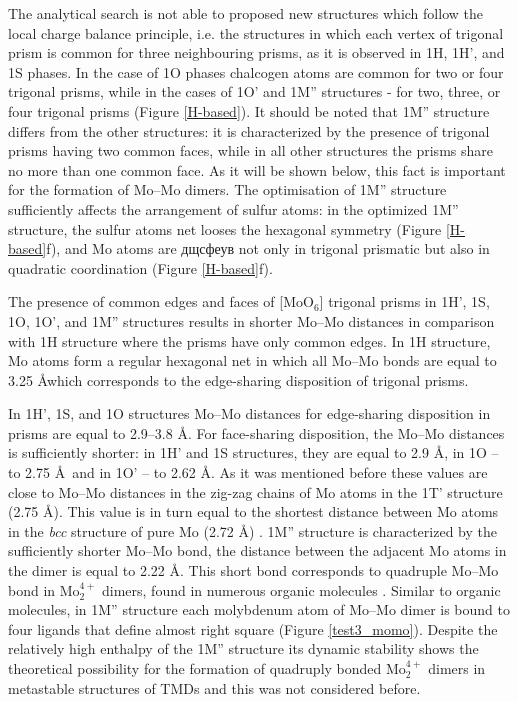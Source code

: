 \documentclass[a4paperm]{article}
\begin{document}
The analytical search is not able to proposed new structures which follow the local charge balance principle, i.e. the structures in which each vertex of trigonal prism is common for three neighbouring prisms, as it is observed in 1H, 1H', and 1S phases. In the case of 1O phases chalcogen atoms are common for two or four trigonal prisms, while in the cases of 1O' and 1M'' structures - for two, three, or four trigonal prisms (Figure \ref{H-based}). It should be noted that 1M'' structure differs from the other structures: it is characterized by the presence of trigonal prisms having two common faces, while in all other structures the prisms share no more than one common face.
As it will be shown below, this fact is important for the formation of Mo--Mo dimers.
The optimisation of 1M'' structure sufficiently affects the arrangement of sulfur atoms: in the optimized 1M'' structure, the sulfur atoms net looses the hexagonal symmetry (Figure \ref{H-based}f), and Mo atoms are дщсфеув not only in trigonal prismatic but also in quadratic coordination (Figure \ref{H-based}f).


The presence of common edges and faces of [MoO$_6$] trigonal prisms in 1H', 1S, 1O, 1O', and 1M'' structures results in shorter Mo--Mo distances in comparison with 1H structure where the prisms have only common edges.
In 1H structure, Mo atoms form a regular hexagonal net in which all Mo--Mo bonds are equal to 3.25 \AA which corresponds to the edge-sharing disposition of trigonal prisms.

In 1H', 1S, and 1O structures Mo--Mo distances for edge-sharing disposition in prisms are equal to 2.9--3.8 \AA.
For face-sharing disposition, the Mo--Mo distances is sufficiently shorter: in 1H' and 1S structures, they are equal to 2.9 \AA, in 1O -- to 2.75 \AA\ and in 1O' -- to 2.62 \AA.
As it was mentioned before these values are close to Mo--Mo distances in the zig-zag chains of Mo atoms in the 1T' structure (2.75 \AA).
This value is in turn equal to the shortest distance between Mo atoms in the {\it bcc} structure of pure Mo (2.72 \AA) \cite{MoV}.
1M'' structure is characterized by the sufficiently shorter Mo--Mo bond, the distance between the adjacent Mo atoms in the dimer is equal to 2.22 \AA.
This short bond corresponds to quadruple Mo--Mo bond in Mo$_2^{4+}$ dimers, found in numerous organic molecules \cite{momo}.
Similar to organic molecules, in 1M'' structure  each molybdenum atom of Mo--Mo dimer is bound to four ligands that define almost right square (Figure \ref{test3_momo}).
Despite the relatively high enthalpy of the 1M'' structure its dynamic stability shows the theoretical possibility for the formation of quadruply bonded Mo$_2^{4+}$ dimers in metastable structures of TMDs and this was not considered before.
\end{document}

